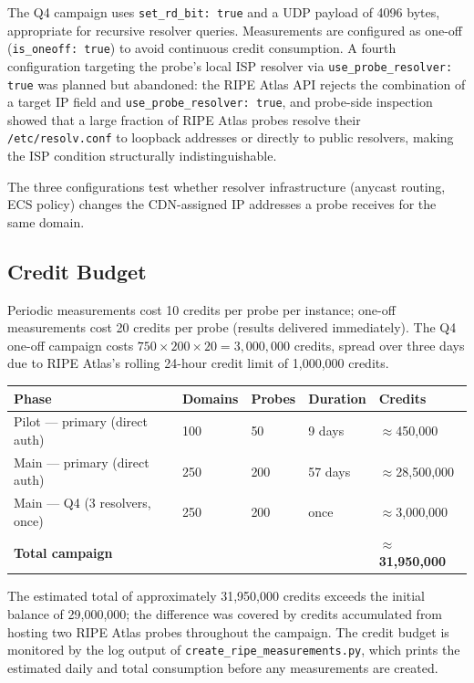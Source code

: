 The Q4 campaign uses \texttt{set\_rd\_bit: true} and a \ac{UDP} payload of 4096 bytes, appropriate for recursive resolver queries. Measurements are configured as one-off (\texttt{is\_oneoff: true}) to avoid continuous credit consumption. A fourth configuration targeting the probe's local \ac{ISP} resolver via \texttt{use\_probe\_resolver: true} was planned but abandoned: the RIPE Atlas \ac{API} rejects the combination of a target \ac{IP} field and \texttt{use\_probe\_resolver: true}, and probe-side inspection showed that a large fraction of RIPE Atlas probes resolve their \texttt{/etc/resolv.conf} to loopback addresses or directly to public resolvers, making the \ac{ISP} condition structurally indistinguishable.

The three configurations test whether resolver infrastructure (anycast routing, \ac{ECS} policy) changes the \ac{CDN}-assigned \ac{IP} addresses a probe receives for the same domain.

\subsection{Credit Budget}
\label{subsec:3.3.4}

Periodic measurements cost 10 credits per probe per instance; one-off measurements cost 20 credits per probe (results delivered immediately). The Q4 one-off campaign costs $750 \times 200 \times 20 = 3{,}000{,}000$ credits, spread over three days due to RIPE Atlas's rolling 24-hour credit limit of 1,000,000 credits.

\begin{table}[H]
\centering
\small
\begin{tabular}{l l l l l}
\toprule
\textbf{Phase} & \textbf{Domains} & \textbf{Probes} & \textbf{Duration} & \textbf{Credits} \\
\midrule
Pilot --- primary (direct auth)  & 100 &  50 & 9 days  & $\approx$450,000 \\
Main --- primary (direct auth)   & 250 & 200 & 57 days & $\approx$28,500,000 \\
Main --- Q4 (3 resolvers, once)  & 250 & 200 & once    & $\approx$3,000,000 \\
\textbf{Total campaign}          &     &     &         & $\approx$\textbf{31,950,000} \\
\bottomrule
\end{tabular}
\end{table}

The estimated total of approximately 31,950,000 credits exceeds the initial balance of 29,000,000; the difference was covered by credits accumulated from hosting two RIPE Atlas probes throughout the campaign. The credit budget is monitored by the log output of \texttt{create\_ripe\_measurements.py}, which prints the estimated daily and total consumption before any measurements are created.

